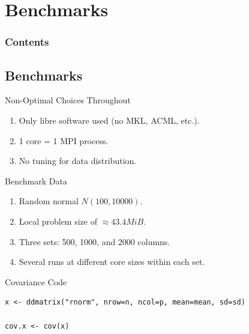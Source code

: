 \section{Benchmarks}

\hidenum
\begin{frame}[noframenumbering]
\frametitle{Contents}
\end{frame}
\shownum



\subsection{Benchmarks}

\begin{frame}
  \begin{block}{Non-Optimal Choices Throughout}
    \begin{enumerate}[<+-|alert@+>]
      \item Only libre software used (no MKL, ACML, etc.).
      \item 1 core = 1 MPI process.
      \item No tuning for data distribution.
    \end{enumerate}
  \end{block}
\end{frame}

\begin{frame}
  \begin{block}{Benchmark Data}
    \begin{enumerate}[<+-|alert@+>]
      \item Random normal $N(100, 10000)$.
      \item Local problem size of $\approx 43.4 MiB$.
      \item Three sets:  500, 1000, and 2000 columns.
      \item Several runs at different core sizes within each set.
    \end{enumerate}
  \end{block}
\end{frame}




\begin{frame}[fragile]
  \begin{block}{Covariance Code}
\begin{lstlisting}
x <- ddmatrix("rnorm", nrow=n, ncol=p, mean=mean, sd=sd)

cov.x <- cov(x)
\end{lstlisting}
  \end{block}
\end{frame}

